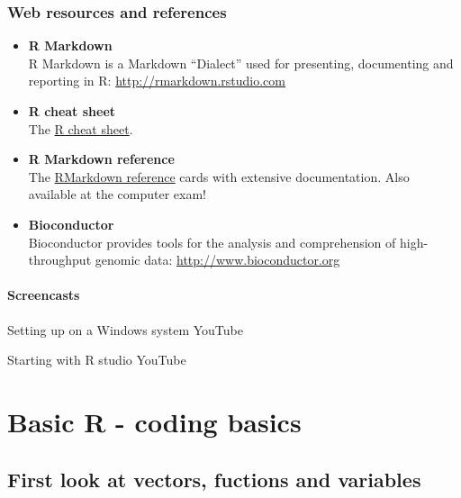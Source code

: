 \documentclass[]{book}
\begin{document}
\hypertarget{web-resources-and-references}{%
\subsection*{Web resources and references}\label{web-resources-and-references}}

\begin{itemize}
\item
  \textbf{R Markdown}\\
  R Markdown is a Markdown ``Dialect'' used for presenting, documenting and reporting in R: \href{http://rmarkdown.rstudio.com/}{http://rmarkdown.rstudio.com}
\item
  \textbf{R cheat sheet}\\
  The \href{figures/R_cheatsheet.pdf}{R cheat sheet}.
\item
  \textbf{R Markdown reference}\\
  The \href{https://www.rstudio.com/wp-content/uploads/2015/03/rmarkdown-reference.pdf}{RMarkdown reference} cards with extensive documentation. Also available at the computer exam!
\item
  \textbf{Bioconductor}\\
  Bioconductor provides tools for the analysis and comprehension of high- throughput genomic data: \href{http://www.bioconductor.org/}{http://www.bioconductor.org}
\end{itemize}

\hypertarget{screencasts}{%
\subsubsection*{Screencasts}\label{screencasts}}

Setting up on a Windows system
YouTube

Starting with R studio
YouTube

\hypertarget{basic-r---coding-basics}{%
\chapter{Basic R - coding basics}\label{basic-r---coding-basics}}

\hypertarget{first-look-at-vectors-fuctions-and-variables}{%
\section{First look at vectors, fuctions and variables}\label{first-look-at-vectors-fuctions-and-variables}}
\end{document}
